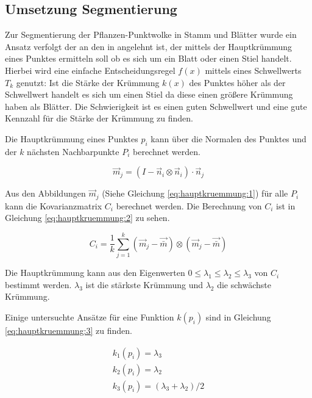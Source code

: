 \documentclass[12pt,titlepage, twoside]{article}
\begin{document}
\subsection{Umsetzung Segmentierung}
\label{sec:realisierung:implementierung3}

Zur Segmentierung der Pflanzen-Punktwolke in Stamm und Blätter wurde ein Ansatz verfolgt der an den in \cite{ThreeBasics} angelehnt ist, der mittels der Hauptkrümmung eines Punktes ermitteln soll ob es sich um ein Blatt oder einen Stiel handelt. 
Hierbei wird eine einfache Entscheidungsregel $f(x)$ mittels eines Schwellwerts $T_k$ genutzt: Ist die Stärke der Krümmung $k(x)$ des Punktes höher als der Schwellwert handelt es sich um einen Stiel da diese einen größere Krümmung haben als Blätter.
Die Schwierigkeit ist es einen guten Schwellwert und eine gute Kennzahl für die Stärke der Krümmung zu finden.

Die Hauptkrümmung eines Punktes $p_i$ kann über die Normalen des Punktes und der $k$ nächsten Nachbarpunkte $P_i$ berechnet werden.

\begin{equation}
\label{eq:hauptkruemmung:1}
\vec{m}_j = (I - \vec{n}_i \otimes \vec{n}_i ) \cdot \vec{n}_j
\end{equation}

Aus den Abbildungen $\vec{m}_j$ (Siehe Gleichung \ref{eq:hauptkruemmung:1}) für alle $P_i$ kann die Kovarianzmatrix $C_i$ berechnet werden. Die Berechnung von $C_i$ ist in Gleichung \ref{eq:hauptkruemmung:2} zu sehen.

\begin{equation}
\label{eq:hauptkruemmung:2}
C_i = \frac{1}{k} \sum_{j=1}^k{(\vec{m}_j - \vec{\bar{m}}) \otimes (\vec{m}_j - \vec{\bar{m}})}
\end{equation}

Die Hauptkrümmung kann aus den Eigenwerten $0 \leq \lambda_1 \leq \lambda_2 \leq \lambda_3$ von $C_i$ bestimmt werden. $\lambda_3$ ist die stärkste Krümmung und $\lambda_2$ die schwächste Krümmung.

Einige untersuchte Ansätze für eine Funktion $k(p_i)$ sind in Gleichung \ref{eq:hauptkruemmung:3} zu finden.

\begin{equation}
\label{eq:hauptkruemmung:3}
\begin{array}{ll}
k_1(p_i) = \lambda_3 \\
k_2(p_i) = \lambda_2 \\
k_3(p_i) = (\lambda_3 + \lambda_2) / 2 
\end{array}{}
\end{equation}
\end{document}

